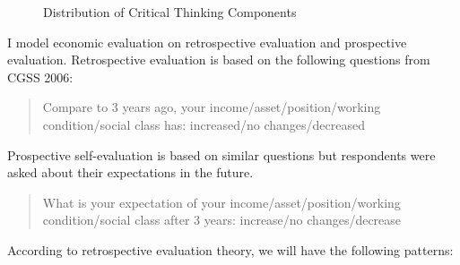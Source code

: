 \documentclass[12pt]{article}\usepackage[]{graphicx}\usepackage[]{color}
\begin{document}
\begin{figure}
	\centering
	\caption{\label{Critical} Distribution of Critical Thinking Components}
\end{figure}


	
I model economic evaluation on retrospective evaluation and prospective evaluation. Retrospective evaluation is based on the following questions from CGSS 2006:
\begin{quotation}
	Compare to 3 years ago, your income/asset/position/working condition/social class has: increased/no changes/decreased
\end{quotation}
Prospective self-evaluation is based on similar questions but respondents were asked about their expectations in the future.
\begin{quotation}
	What is your expectation of your income/asset/position/working condition/social class after 3 years: increase/no changes/decrease
\end{quotation}
According to retrospective evaluation theory, we will have the following patterns:
\end{document}
